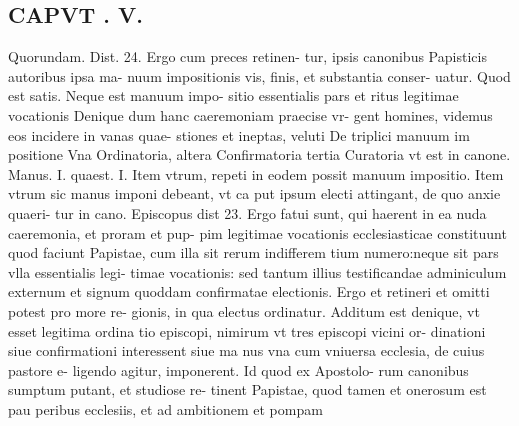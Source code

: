 \documentclass{article}
\begin{document}
\begin{pages}
\section*{CAPVT . V. }
\marginpar{[ p.361 ]}\pstart Quorundam. Dist. 24. Ergo cum preces retinen- tur, ipsis canonibus Papisticis autoribus ipsa ma- nuum impositionis vis, finis, et substantia conser- uatur. Quod est satis. Neque est manuum impo- sitio essentialis pars et ritus legitimae vocationis Denique dum hanc caeremoniam praecise vr- gent homines, videmus eos incidere in vanas quae- stiones et ineptas, veluti De triplici manuum im positione Vna Ordinatoria, altera Confirmatoria tertia Curatoria vt est in canone. Manus. I. quaest. I. Item vtrum, repeti in eodem possit manuum impositio. Item vtrum sic manus imponi debeant, vt ca put ipsum electi attingant, de quo anxie quaeri- tur in cano. Episcopus dist 23. Ergo fatui sunt, qui haerent in ea nuda caeremonia, et proram et pup- pim legitimae vocationis ecclesiasticae constituunt quod faciunt Papistae, cum illa sit rerum indifferem tium numero:neque sit pars vlla essentialis legi- timae vocationis: sed tantum illius testificandae adminiculum externum et signum quoddam confirmatae electionis. Ergo et retineri et omitti potest pro more re- gionis, in qua electus ordinatur. Additum est denique, vt esset legitima ordina tio episcopi, nimirum vt tres episcopi vicini or- dinationi siue confirmationi interessent siue ma nus vna cum vniuersa ecclesia, de cuius pastore e- ligendo agitur, imponerent. Id quod ex Apostolo- rum canonibus sumptum putant, et studiose re- tinent Papistae, quod tamen et onerosum est pau peribus ecclesiis, et ad ambitionem et pompam  \pend

\end{pages}
\end{document}
